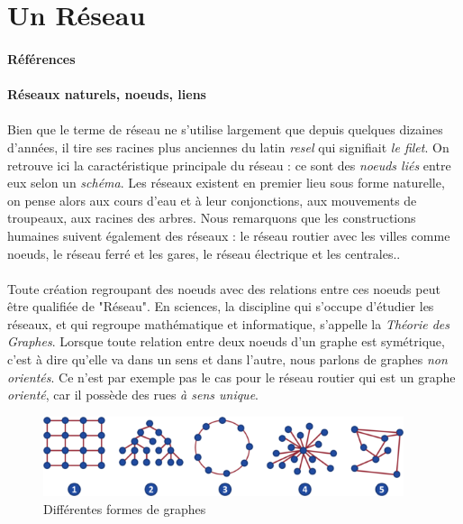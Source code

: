 \section{Un Réseau}
\paragraph{Références} \cite{DarkWeb0}

\paragraph{Réseaux naturels, noeuds, liens}

\paragraph{} Bien que le terme de réseau ne s'utilise largement que depuis quelques dizaines d'années, il tire ses
racines plus anciennes du latin \emph{resel} qui signifiait \emph{le filet}. On retrouve ici la caractéristique
principale du réseau : ce sont des \emph{noeuds liés} entre eux selon un \emph{schéma}. Les réseaux existent en
premier lieu sous forme naturelle, on pense alors aux cours d'eau et à leur conjonctions, aux mouvements de troupeaux,
aux racines des arbres. Nous remarquons que les constructions humaines suivent également des réseaux : le réseau routier
avec les villes comme noeuds, le réseau ferré et les gares, le réseau électrique et les centrales..

\paragraph{} Toute création regroupant des noeuds avec des relations entre ces noeuds peut être qualifiée de "Réseau". En sciences,
la discipline qui s'occupe d'étudier les réseaux, et qui regroupe mathématique et informatique, s'appelle
la \emph{Théorie des Graphes}. Lorsque toute relation entre deux noeuds d'un graphe est symétrique, c'est à dire qu'elle va
dans un sens et dans l'autre, nous parlons de graphes \emph{non orientés}. Ce n'est par exemple pas le cas pour le
réseau routier qui est un graphe \emph{orienté}, car il possède des rues \emph{à sens unique}.

\begin{figure}[h]
    \centering
    \includegraphics[width=400px]{chapters/02/images/reseaux.png}
    \caption{\label{Réseaux, graphes} Différentes formes de graphes}
\end{figure}

